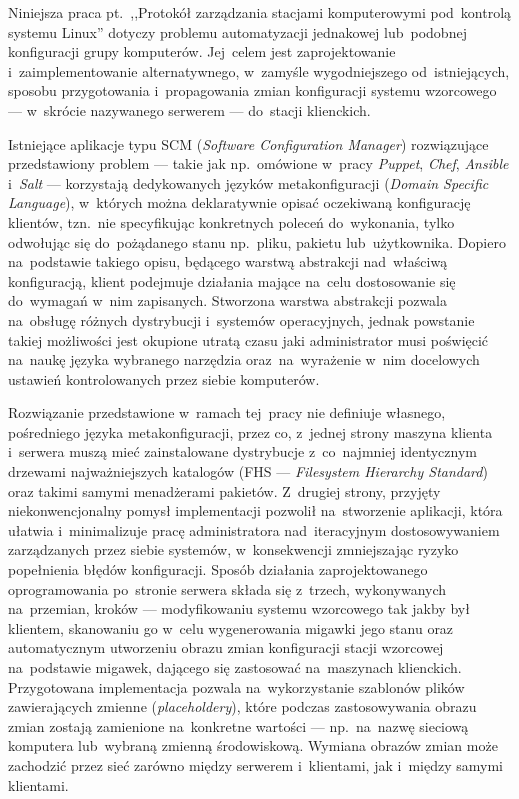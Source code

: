 \documentclass[11pt,a4paper]{article}
\begin{document}
Niniejsza praca pt.~,,Protokół zarządzania stacjami komputerowymi pod~kontrolą systemu Linux'' dotyczy problemu automatyzacji jednakowej lub~podobnej konfiguracji grupy komputerów. Jej~celem jest zaprojektowanie i~zaimplementowanie alternatywnego, w~zamyśle wygodniejszego od~istniejących, sposobu przygotowania i~propagowania zmian konfiguracji systemu wzorcowego --- w~skrócie nazywanego serwerem --- do~stacji klienckich.%

Istniejące aplikacje typu SCM (\emph{Software Configuration Manager}) rozwiązujące przedstawiony problem --- takie jak np.~omówione w~pracy \emph{Puppet}, \emph{Chef}, \emph{Ansible} i~\emph{Salt} --- korzystają dedykowanych języków metakonfiguracji (\emph{Domain Specific Language}), w~których można deklaratywnie opisać oczekiwaną konfigurację klientów, tzn.~nie specyfikując konkretnych poleceń do~wykonania, tylko odwołując się do~pożądanego stanu np.~pliku, pakietu lub~użytkownika. Dopiero na~podstawie takiego opisu, będącego warstwą abstrakcji nad~właściwą konfiguracją, klient podejmuje działania mające na~celu dostosowanie się do~wymagań w~nim zapisanych. Stworzona warstwa abstrakcji pozwala na~obsługę różnych dystrybucji i~systemów operacyjnych, jednak powstanie takiej możliwości jest okupione utratą czasu jaki administrator musi poświęcić na~naukę języka wybranego narzędzia oraz~na~wyrażenie w~nim docelowych ustawień kontrolowanych przez siebie komputerów.

Rozwiązanie przedstawione w~ramach tej~pracy nie definiuje własnego, pośredniego języka metakonfiguracji, przez co, z~jednej strony maszyna klienta i~serwera muszą mieć zainstalowane dystrybucje z~co~najmniej identycznym drzewami najważniejszych katalogów (FHS --- \emph{Filesystem Hierarchy Standard}) oraz takimi samymi menadżerami pakietów. Z~drugiej strony, przyjęty niekonwencjonalny pomysł implementacji pozwolił na~stworzenie aplikacji, która ułatwia i~minimalizuje pracę administratora nad~iteracyjnym dostosowywaniem zarządzanych przez siebie systemów, w~konsekwencji zmniejszając ryzyko popełnienia błędów konfiguracji. Sposób działania zaprojektowanego oprogramowania po~stronie serwera składa się z~trzech, wykonywanych na~przemian, kroków --- modyfikowaniu systemu wzorcowego tak jakby był klientem, skanowaniu go w~celu wygenerowania migawki jego stanu oraz automatycznym utworzeniu obrazu zmian konfiguracji stacji wzorcowej na~podstawie migawek, dającego się zastosować na~maszynach klienckich. Przygotowana implementacja pozwala na~wykorzystanie szablonów plików zawierających zmienne (\emph{placeholdery}), które podczas zastosowywania obrazu zmian zostają zamienione na~konkretne wartości --- np.~na~nazwę sieciową komputera lub~wybraną zmienną środowiskową. Wymiana obrazów zmian może zachodzić przez sieć zarówno między serwerem i~klientami, jak i~między samymi klientami.
\end{document}
